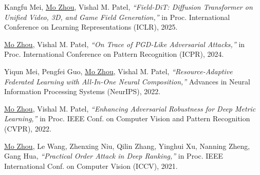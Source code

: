 \documentclass[10pt,margin,line,pifont,palatino,courier]{res}
\begin{document}
\begin{resume}
\begin{enumerate}[noitemsep, leftmargin=*, label={[C{\arabic*}]}]
\item Kangfu Mei, \underline{Mo Zhou}, Vishal M. Patel,
\reversemarginpar{}
\textit{``Field-DiT: Diffusion Transformer on Unified Video, 3D, and Game Field Generation,''}
in Proc. International Conference on Learning Representations (ICLR), 2025.

\item \underline{Mo Zhou}, Vishal M. Patel,
\reversemarginpar{}
\textit{``On Trace of PGD-Like Adversarial Attacks,''}
in Proc. International Conference on Pattern Recognition (ICPR), 2024.

\item Yiqun Mei, Pengfei Guo, \underline{Mo Zhou}, Vishal M. Patel,
\reversemarginpar{}
\textit{``Resource-Adaptive Federated Learning with All-In-One Neural Composition,''}
Advances in Neural Information Processing Systems (NeurIPS), 2022.

\item \underline{Mo Zhou}, Vishal M. Patel,
\reversemarginpar{}
\textit{``Enhancing Adversarial Robustness for Deep Metric Learning,''}
in Proc. IEEE Conf. on Computer Vision and Pattern Recognition (CVPR), 2022.

\item \underline{Mo Zhou},
\reversemarginpar{}
Le Wang, Zhenxing Niu, Qilin Zhang, Yinghui Xu, Nanning Zheng, Gang Hua,
\textit{``Practical Order Attack in Deep Ranking,''}
in Proc. IEEE International Conf. on Computer Vision (ICCV), 2021.


\end{enumerate}
\end{resume}
\end{document}
